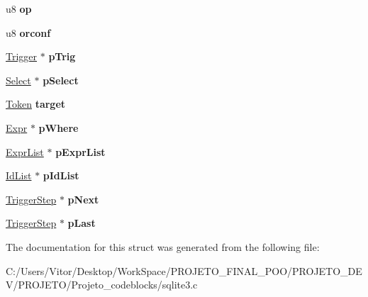 \begin{DoxyCompactItemize}
\item 
\hypertarget{struct_trigger_step_a20269855c80d869d498fcb93401832fd}{u8 {\bfseries op}}\label{struct_trigger_step_a20269855c80d869d498fcb93401832fd}

\item 
\hypertarget{struct_trigger_step_a4ed8b2571fde96e84f637184453e73e3}{u8 {\bfseries orconf}}\label{struct_trigger_step_a4ed8b2571fde96e84f637184453e73e3}

\item 
\hypertarget{struct_trigger_step_a70671e85796776db06c732ab6ae4ae0d}{\hyperlink{struct_trigger}{Trigger} $\ast$ {\bfseries p\-Trig}}\label{struct_trigger_step_a70671e85796776db06c732ab6ae4ae0d}

\item 
\hypertarget{struct_trigger_step_a90bf3353653cedf364a7fb2eb89a19c4}{\hyperlink{struct_select}{Select} $\ast$ {\bfseries p\-Select}}\label{struct_trigger_step_a90bf3353653cedf364a7fb2eb89a19c4}

\item 
\hypertarget{struct_trigger_step_a8b860bb5f466b1522125d446b58d860a}{\hyperlink{struct_token}{Token} {\bfseries target}}\label{struct_trigger_step_a8b860bb5f466b1522125d446b58d860a}

\item 
\hypertarget{struct_trigger_step_ad4c293b04dfda535f3aad5b9e02726c7}{\hyperlink{struct_expr}{Expr} $\ast$ {\bfseries p\-Where}}\label{struct_trigger_step_ad4c293b04dfda535f3aad5b9e02726c7}

\item 
\hypertarget{struct_trigger_step_a607602af65ecf6c7e6cac4ea8532ac1d}{\hyperlink{struct_expr_list}{Expr\-List} $\ast$ {\bfseries p\-Expr\-List}}\label{struct_trigger_step_a607602af65ecf6c7e6cac4ea8532ac1d}

\item 
\hypertarget{struct_trigger_step_a6b91bf578544104f8bd4bd5b958ddd8c}{\hyperlink{struct_id_list}{Id\-List} $\ast$ {\bfseries p\-Id\-List}}\label{struct_trigger_step_a6b91bf578544104f8bd4bd5b958ddd8c}

\item 
\hypertarget{struct_trigger_step_a0757a0d22dbe2f7f57706014dd35759b}{\hyperlink{struct_trigger_step}{Trigger\-Step} $\ast$ {\bfseries p\-Next}}\label{struct_trigger_step_a0757a0d22dbe2f7f57706014dd35759b}

\item 
\hypertarget{struct_trigger_step_a0aae9ea7f436881c0e9e614476a69584}{\hyperlink{struct_trigger_step}{Trigger\-Step} $\ast$ {\bfseries p\-Last}}\label{struct_trigger_step_a0aae9ea7f436881c0e9e614476a69584}

\end{DoxyCompactItemize}


The documentation for this struct was generated from the following file\-:\begin{DoxyCompactItemize}
\item 
C\-:/\-Users/\-Vitor/\-Desktop/\-Work\-Space/\-P\-R\-O\-J\-E\-T\-O\-\_\-\-F\-I\-N\-A\-L\-\_\-\-P\-O\-O/\-P\-R\-O\-J\-E\-T\-O\-\_\-\-D\-E\-V/\-P\-R\-O\-J\-E\-T\-O/\-Projeto\-\_\-codeblocks/sqlite3.\-c\end{DoxyCompactItemize}
